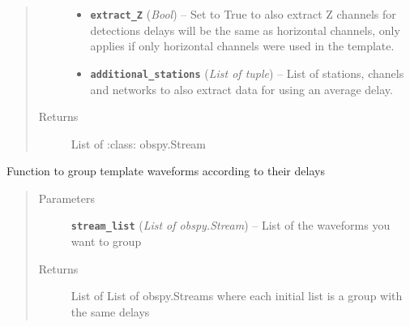 \documentclass[a4paper,10pt,english]{sphinxmanual}
\begin{document}
\begin{fulllineitems}
\begin{quote}
\begin{description}
\begin{itemize}
\item {} 
\textbf{\texttt{extract\_Z}} (\emph{Bool}) -- Set to True to also extract Z channels for detections            delays will be the same as horizontal channels, only applies if            only horizontal channels were used in the template.

\item {} 
\textbf{\texttt{additional\_stations}} (\emph{List of tuple}) -- List of stations, chanels and networks to also            extract data for using an average delay.

\end{itemize}

\item[{Returns}] \leavevmode
List of :class: obspy.Stream

\end{description}\end{quote}

\end{fulllineitems}


\begin{fulllineitems}
\label{submodules/utils.clustering:clustering.group_delays}
Function to group template waveforms according to their delays
\begin{quote}\begin{description}
\item[{Parameters}] \leavevmode
\textbf{\texttt{stream\_list}} (\emph{List of obspy.Stream}) -- List of the waveforms you want to group

\item[{Returns}] \leavevmode
List of List of obspy.Streams where each initial list is a group            with the same delays

\end{description}\end{quote}

\end{fulllineitems}

\end{document}

